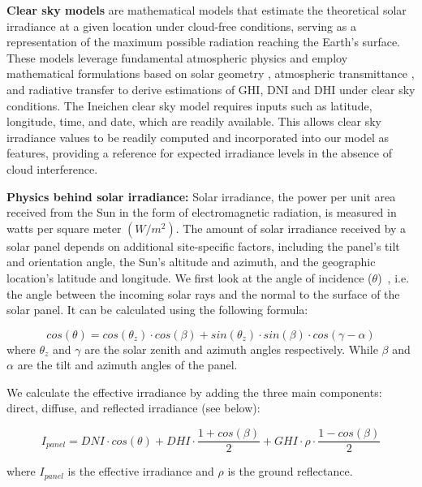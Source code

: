 \textbf{Clear sky models} \cite{ineichen1, clearsky1, perez1, clearsky_solis} are mathematical models that estimate the theoretical solar irradiance at a given location under cloud-free conditions, serving as a representation of the maximum possible radiation reaching the Earth's surface. These models leverage fundamental atmospheric physics and employ mathematical formulations based on solar geometry \cite{clearsky1}, atmospheric transmittance \cite{clearsky1}, and radiative transfer \cite{clearsky1} to derive estimations of GHI, DNI and DHI under clear sky conditions. The Ineichen clear sky model \cite{ineichen1} requires inputs such as latitude, longitude, time, and date, which are readily available. This allows clear sky irradiance values to be readily computed and incorporated into our model as features, providing a reference for expected irradiance levels in the absence of cloud interference.

\textbf{Physics behind solar irradiance:}
Solar irradiance, the power per unit area received from the Sun in the form of electromagnetic radiation, is measured in watts per square meter $(W/m^2)$. The amount of solar irradiance received by a solar panel depends on additional site-specific factors, including the panel's tilt and orientation angle, the Sun's altitude and azimuth, and the geographic location's latitude and longitude. We first look at the angle of incidence ($\theta$)~\cite{sandia}, i.e. the angle between the incoming solar rays and the normal to the surface of the solar panel. It can be calculated using the following formula:

\begin{equation}
cos(\theta)=cos(\theta_{z}) \cdot cos(\beta) + sin(\theta_{z}) \cdot sin(\beta) \cdot cos(\gamma - \alpha)
\end{equation}
where $\theta_{z}$ and $\gamma$ are the solar zenith and azimuth angles respectively. While $\beta$ and $\alpha$ are the tilt and azimuth angles of the panel.

We calculate the effective irradiance by adding the three main components: direct, diffuse, and reflected irradiance (see below):  

\begin{equation}
   I_{panel} = DNI \cdot cos(\theta) + DHI \cdot \frac{1 + cos(\beta)}{2} + GHI \cdot \rho \cdot \frac{1 - cos(\beta)}{2} 
\end{equation}

where $I_{panel}$ is the effective irradiance and $\rho$ is the ground reflectance.

